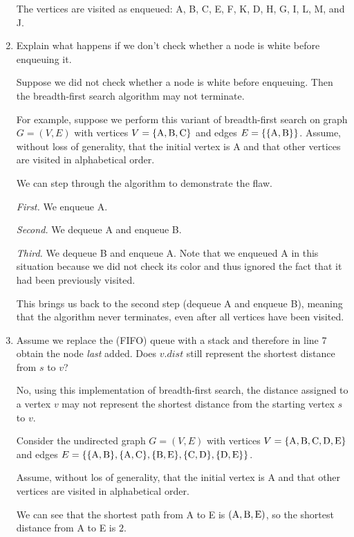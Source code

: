 \begin{enumerate}
\begin{solution}
The vertices are visited as enqueued: A, B, C, E, F, K, D, H, G, I, L, M, and J.
\end{solution}
\newpage
\item Explain what happens if we don't check whether a node is white before enqueuing it.
\begin{solution}
Suppose we did not check whether a node is white before enqueuing. Then the breadth-first search algorithm may not terminate.

For example, suppose we perform this variant of breadth-first search on graph $G=(V,E)$ with vertices $V=\{{\rm A},{\rm B},{\rm C}\}$ and edges $E=\{\{{\rm A},{\rm B}\}\}$. Assume, without loss of generality, that the initial vertex is A and that other vertices are visited in alphabetical order.

We can step through the algorithm to demonstrate the flaw.

\textit{First. }We enqueue A.

\textit{Second. }We dequeue A and enqueue B.

\textit{Third. }We dequeue B and enqueue A. Note that we enqueued A in this situation because we did not check its color and thus ignored the fact that it had been previously visited. 

This brings us back to the second step (dequeue A and enqueue B), meaning that the algorithm never terminates, even after all vertices have been visited.
\end{solution}
\newpage
\item Assume we replace the (FIFO) queue with a stack and therefore in line 7 obtain the node \emph{last} added. Does $v.dist$ still represent the shortest distance from $s$ to $v$?
\begin{solution}
No, using this implementation of breadth-first search, the distance assigned to a vertex $v$ may not represent the shortest distance from the starting vertex $s$ to $v$.

Consider the undirected graph $G=(V,E)$ with vertices $V=\{{\rm A},{\rm B},{\rm C},{\rm D},{\rm E}\}$ and edges $E=\{\{{\rm A},{\rm B}\},\{{\rm A},{\rm C}\},\{{\rm B},{\rm E}\},\{{\rm C},{\rm D}\},\{{\rm D},{\rm E}\}\}$. 

Assume, without los of generality, that the initial vertex is A and that other vertices are visited in alphabetical order.

We can see that the shortest path from A to E is $({\rm A},{\rm B},{\rm E})$, so the shortest distance from A to E is $2$.


\end{solution}
\end{enumerate}
